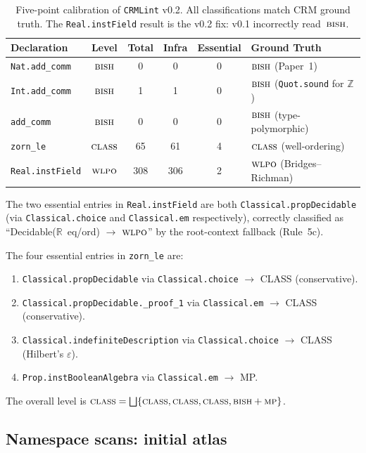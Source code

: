 \documentclass[12pt, a4paper]{article}
\theoremstyle{plain}
\theoremstyle{definition}
\theoremstyle{remark}
\newcommand{\BISH}{\textsc{bish}}
\newcommand{\BISHMP}{\textsc{bish\,+\,mp}}
\newcommand{\WLPO}{\textsc{wlpo}}
\newcommand{\CLASS}{\textsc{class}}
\newcommand{\CRMLint}{\texttt{CRMLint}}
\begin{document}
\begin{table}[h]
\centering
\begin{tabular}{lccccl}
\toprule
Declaration & Level & Total & Infra & Essential & Ground Truth \\
\midrule
\texttt{Nat.add\_comm}  & $\BISH$  & 0   & 0   & 0 & $\BISH$ (Paper~1) \\
\texttt{Int.add\_comm}  & $\BISH$  & 1   & 1   & 0 & $\BISH$ (\texttt{Quot.sound} for $\mathbb{Z}$) \\
\texttt{add\_comm}      & $\BISH$  & 0   & 0   & 0 & $\BISH$ (type-polymorphic) \\
\texttt{zorn\_le}       & $\CLASS$ & 65  & 61  & 4 & $\CLASS$ (well-ordering) \\
\texttt{Real.instField} & $\WLPO$  & 308 & 306 & 2 & $\WLPO$ (Bridges--Richman) \\
\bottomrule
\end{tabular}
\caption{Five-point calibration of \CRMLint{} v0.2.  All classifications
match CRM ground truth.  The \texttt{Real.instField} result is the v0.2
fix: v0.1 incorrectly read~$\BISH$.}
\label{tab:calibration}
\end{table}

The two essential entries in \texttt{Real.instField} are both
\texttt{Classical.propDecidable} (via \texttt{Classical.choice} and
\texttt{Classical.em} respectively), correctly classified as
``Decidable($\mathbb{R}$~eq/ord) $\to$ $\WLPO$'' by the root-context
fallback (Rule~5c).

The four essential entries in \texttt{zorn\_le} are:
\begin{enumerate}[nosep]
\item \texttt{Classical.propDecidable} via \texttt{Classical.choice} $\to$ CLASS (conservative).
\item \texttt{Classical.propDecidable.\_proof\_1} via \texttt{Classical.em} $\to$ CLASS (conservative).
\item \texttt{Classical.indefiniteDescription} via \texttt{Classical.choice} $\to$ CLASS (Hilbert's $\varepsilon$).
\item \texttt{Prop.instBooleanAlgebra} via \texttt{Classical.em} $\to$ MP.
\end{enumerate}
The overall level is $\CLASS = \bigsqcup\{\CLASS, \CLASS, \CLASS, \BISHMP\}$.

\subsection{Namespace scans: initial atlas}
\end{document}
